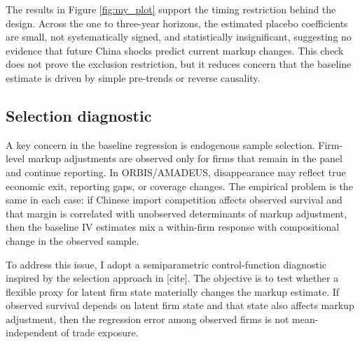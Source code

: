 \documentclass[12pt]{article}
\newcommand{\textcite}[2][]{[cite]}
\begin{document}
The results in Figure \ref{fig:my_plot} support the timing restriction behind the design. Across the one to three-year horizons, the estimated placebo coefficients are small, not systematically signed, and statistically insignificant, suggesting no evidence that future China shocks predict current markup changes. This check does not prove the exclusion restriction, but it reduces concern that the baseline estimate is driven by simple pre-trends or reverse causality.

\subsection{Selection diagnostic}
\label{sec:selection}

A key concern in the baseline regression is endogenous sample selection. Firm-level markup adjustments are observed only for firms that remain in the panel and continue reporting. In ORBIS/AMADEUS, disappearance may reflect true economic exit, reporting gaps, or coverage changes. The empirical problem is the same in each case: if Chinese import competition affects observed survival and that margin is correlated with unobserved determinants of markup adjustment, then the baseline IV estimates mix a within-firm response with compositional change in the observed sample.

To address this issue, I adopt a semiparametric control-function diagnostic inspired by the selection approach in \textcite{backusWhyProductivityCorrelated2020,pavcnikTradeLiberalizationExit2002}. The objective is to test whether a flexible proxy for latent firm state materially changes the markup estimate. If observed survival depends on latent firm state and that state also affects markup adjustment, then the regression error among observed firms is not mean-independent of trade exposure.
\end{document}
